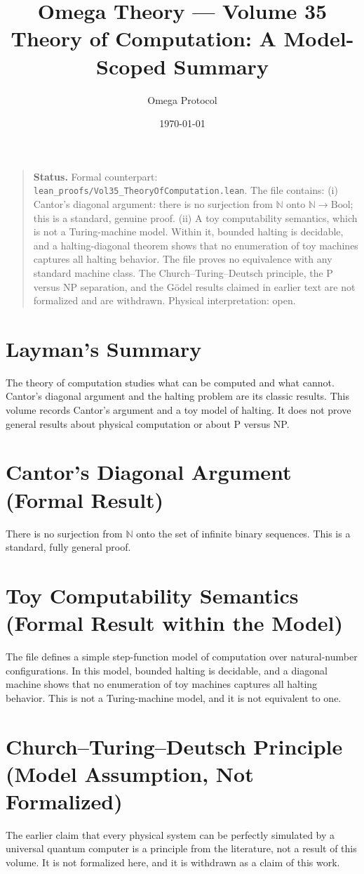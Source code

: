 \documentclass[11pt, a4paper]{article}
\title{Omega Theory --- Volume 35\\\Large Theory of Computation: A Model-Scoped Summary}
\author{Omega Protocol}
\date{\today}
\begin{document}
\maketitle

\begin{quote}
\textbf{Status.} Formal counterpart: \texttt{lean\_proofs/Vol35\_TheoryOfComputation.lean}. The file contains: (i) Cantor's diagonal argument: there is no surjection from $\mathbb{N}$ onto $\mathbb{N} \to \mathrm{Bool}$; this is a standard, genuine proof. (ii) A toy computability semantics, which is not a Turing-machine model. Within it, bounded halting is decidable, and a halting-diagonal theorem shows that no enumeration of toy machines captures all halting behavior. The file proves no equivalence with any standard machine class. The Church--Turing--Deutsch principle, the P versus NP separation, and the Gödel results claimed in earlier text are not formalized and are withdrawn. Physical interpretation: open.
\end{quote}

\section*{Layman's Summary}
The theory of computation studies what can be computed and what cannot. Cantor's diagonal argument and the halting problem are its classic results. This volume records Cantor's argument and a toy model of halting. It does not prove general results about physical computation or about P versus NP.

\section{Cantor's Diagonal Argument (Formal Result)}
There is no surjection from $\mathbb{N}$ onto the set of infinite binary sequences. This is a standard, fully general proof.

\section{Toy Computability Semantics (Formal Result within the Model)}
The file defines a simple step-function model of computation over natural-number configurations. In this model, bounded halting is decidable, and a diagonal machine shows that no enumeration of toy machines captures all halting behavior. This is not a Turing-machine model, and it is not equivalent to one.

\section{Church--Turing--Deutsch Principle (Model Assumption, Not Formalized)}
The earlier claim that every physical system can be perfectly simulated by a universal quantum computer is a principle from the literature, not a result of this volume. It is not formalized here, and it is withdrawn as a claim of this work.
\end{document}
